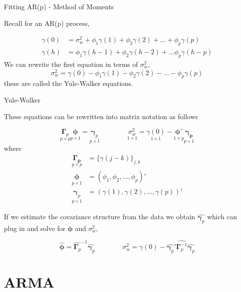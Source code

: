 \documentclass[11pt,ignorenonframetext,]{beamer}
\begin{document}
\begin{frame}[t]{%
\protect\hypertarget{fitting-arp---method-of-moments}{%
Fitting AR(p) - Method of Moments}}

Recall for an AR(p) process,

\[
\begin{aligned}
\gamma(0) &= \sigma^2_w + \phi_1 \gamma(1) + \phi_2 \gamma(2) + \ldots + \phi_p \gamma(p) \\
\gamma(h) &= \phi_1 \gamma(h-1) + \phi_2 \gamma(h-2) + \ldots \phi_p \gamma(h-p)
\end{aligned}
\] We can rewrite the first equation in terms of \(\sigma^2_w\), \[
\sigma^2_w =  \gamma(0) - \phi_1 \gamma(1) - \phi_2 \gamma(2) - \ldots - \phi_p \gamma(p)
\] these are called the Yule-Walker equations.

\end{frame}

\begin{frame}[t]{%
\protect\hypertarget{yule-walker}{%
Yule-Walker}}

These equations can be rewritten into matrix notation as follows

\[
\underset{p \times p}{\symbf\Gamma_p} \underset{p \times 1}{\symbf\phi} = \underset{p \times 1}{\symbf\gamma_p}
\qquad\qquad
\underset{1 \times 1}{\sigma^2_w} = \underset{1 \times 1}{\gamma(0)} - \underset{1 \times p}{\symbf{\phi'}}\underset{p \times 1}{\symbf{\gamma_p}}
\] where \[ 
\begin{aligned}
\underset{p \times p}{\symbf{\Gamma_p}} &= \{\gamma(j-k)\}_{j,k} \\
\underset{p \times 1}{\symbf\phi} &= (\phi_1, \phi_2, \ldots, \phi_p)' \\
\underset{p \times 1}{\symbf\gamma_p} &= (\gamma(1), \gamma(2), \ldots, \gamma(p))'
\end{aligned}
\]

\pause

If we estimate the covariance structure from the data we obtain
\(\hat{\symbf\gamma_p}\) which can plug in and solve for
\(\symbf{\phi}\) and \(\sigma^2_w\),

\[
\hat{\symbf\phi} =\hat{\symbf{\Gamma}_p}^{-1}\hat{\symbf{\gamma}_p}
\qquad\qquad
\sigma^2_w = \gamma(0) - \hat{\symbf{\gamma}_p}' \hat{\symbf{\Gamma}_p^{-1}} \hat{\symbf{\gamma}_p}
\]

\end{frame}

\hypertarget{arma}{%
\section{ARMA}\label{arma}}
\end{document}

